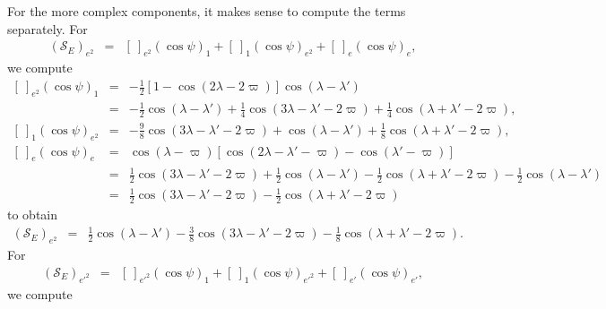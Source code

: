 \documentclass [12pt, a4paper] {article}
\begin{document}
For the more complex components, it makes sense to compute the terms separately. 
For
\begin {eqnarray}
    (\mathcal{S}_E)_{e^2}
    &=& 
    \left[\:\right]_{e^2}
    \left(\cos\psi\right)_1
    +
    \left[\:\right]_1
    \left(\cos\psi\right)_{e^2}
    +
    \left[\:\right]_e
    \left(\cos\psi\right)_{e},
\end {eqnarray}
we compute 
\begin {eqnarray}
    \left[\:\right]_{e^2}
    \left(\cos\psi\right)_1
    &=&
    - 
    \frac{1}{2}[1 - \cos(2\lambda - 2\varpi)]
    \cos(\lambda - \lambda')
    \\
    &=& 
    -
    \frac{1}{2}\cos(\lambda - \lambda')
    +
    \frac{1}{4}\cos(3\lambda - \lambda' - 2\varpi)
    +
    \frac{1}{4}\cos(\lambda + \lambda' - 2\varpi),
    \\
    \left[\:\right]_1
    \left(\cos\psi\right)_{e^2}
    &=&
    -
    \frac{9}{8}\cos(3\lambda - \lambda' - 2\varpi)
    +
    \cos(\lambda - \lambda')
    +
    \frac{1}{8}\cos(\lambda + \lambda' - 2\varpi), 
    \\
    \left[\:\right]_e
    \left(\cos\psi\right)_{e}
    &=&
    \cos(\lambda - \varpi)
    \left[
        \cos(2\lambda - \lambda' - \varpi) - \cos(\lambda' - \varpi)
    \right]
    \\
    &=&
    \frac{1}{2}
    \cos(3\lambda - \lambda' - 2\varpi)
    +    
    \frac{1}{2}
    \cos(\lambda - \lambda')
    - 
    \frac{1}{2}
    \cos(\lambda + \lambda' - 2\varpi)
    - 
    \frac{1}{2}
    \cos(\lambda - \lambda')
    \\
    &=&
    \frac{1}{2}
    \cos(3\lambda - \lambda' - 2\varpi)
    - 
    \frac{1}{2}
    \cos(\lambda + \lambda' - 2\varpi)
\end {eqnarray}
to obtain 
\begin {eqnarray}
    (\mathcal{S}_E)_{e^2}
    &=&
    \frac{1}{2}\cos(\lambda - \lambda')
    -
    \frac{3}{8}\cos(3\lambda - \lambda' - 2\varpi)
    -
    \frac{1}{8}\cos(\lambda + \lambda' - 2\varpi).
\end {eqnarray}
For
\begin {eqnarray}
    (\mathcal{S}_E)_{e'^2}
    &=& 
    \left[\:\right]_{e'^2}
    \left(\cos\psi\right)_1
    +
    \left[\:\right]_1
    \left(\cos\psi\right)_{e'^2}
    +
    \left[\:\right]_{e'}
    \left(\cos\psi\right)_{e'},
\end {eqnarray}
we compute 
\end{document}
